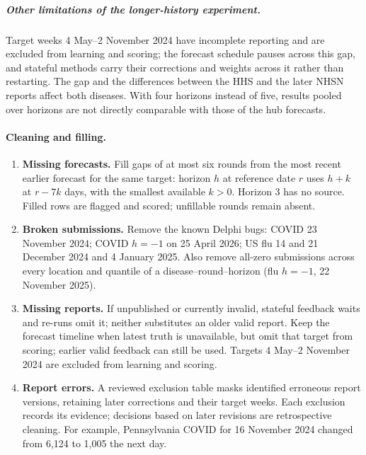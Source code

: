 \documentclass[11pt,a4paper]{article}
\theoremstyle{definition}
\theoremstyle{remark}
\begin{document}
\subparagraph{Other limitations of the longer-history experiment.}
Target weeks 4 May--2 November 2024 have incomplete reporting and are
excluded from learning and scoring; the forecast schedule pauses across
this gap, and stateful methods carry their corrections and weights across
it rather than restarting. The gap and the differences between the HHS and
the later NHSN reports affect both diseases. With four horizons instead of
five, results pooled over horizons are not directly comparable with those
of the hub forecasts.

\paragraph{Cleaning and filling.}
\label{sec:data-issues}
\begin{enumerate}[leftmargin=*,itemsep=2pt]
\item \textbf{Missing forecasts.} Fill gaps of at most six rounds from
the most recent earlier forecast for the same target: horizon $h$ at
reference date $r$ uses $h+k$ at $r-7k$ days, with the smallest available
$k>0$. Horizon 3 has no source. Filled rows are flagged and scored;
unfillable rounds remain absent.
\item \textbf{Broken submissions.} Remove the known Delphi bugs:
COVID 23 November 2024; COVID $h=-1$ on 25 April 2026; US flu 14 and
21 December 2024 and 4 January 2025. Also remove all-zero submissions
across every location and quantile of a disease--round--horizon
(flu $h=-1$, 22 November 2025).
\item \textbf{Missing reports.} If unpublished or currently invalid,
stateful feedback waits and re-runs omit it; neither substitutes an
older valid report. Keep the forecast timeline when latest truth is
unavailable, but omit that target from scoring; earlier valid feedback
can still be used. Targets 4 May--2 November 2024 are excluded from
learning and scoring.
\item \textbf{Report errors.} A reviewed exclusion table masks identified
erroneous report versions, retaining later corrections and their target
weeks. Each exclusion records its evidence; decisions based on later
revisions are retrospective cleaning. For example, Pennsylvania COVID for 16 November 2024 changed
from 6,124 to 1,005 the next day.
\end{enumerate}
\end{document}
